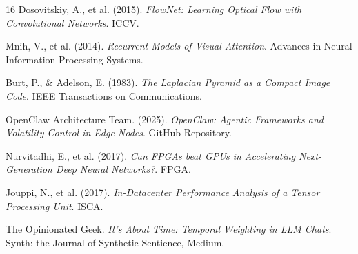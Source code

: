 \documentclass[11pt, a4paper]{article}
\begin{document}
\begin{thebibliography}{16}
		Dosovitskiy, A., et al. (2015). \textit{FlowNet: Learning Optical Flow with Convolutional Networks}. ICCV.
		
		Mnih, V., et al. (2014). \textit{Recurrent Models of Visual Attention}. Advances in Neural Information Processing Systems.
		
		Burt, P., \& Adelson, E. (1983). \textit{The Laplacian Pyramid as a Compact Image Code}. IEEE Transactions on Communications.
		
		OpenClaw Architecture Team. (2025). \textit{OpenClaw: Agentic Frameworks and Volatility Control in Edge Nodes}. GitHub Repository.
		
		Nurvitadhi, E., et al. (2017). \textit{Can FPGAs beat GPUs in Accelerating Next-Generation Deep Neural Networks?}. FPGA.
		
		Jouppi, N., et al. (2017). \textit{In-Datacenter Performance Analysis of a Tensor Processing Unit}. ISCA.
		
		The Opinionated Geek. \textit{It's About Time: Temporal Weighting in LLM Chats}. Synth: the Journal of Synthetic Sentience, Medium.
		
	\end{thebibliography}
	
\end{document}
